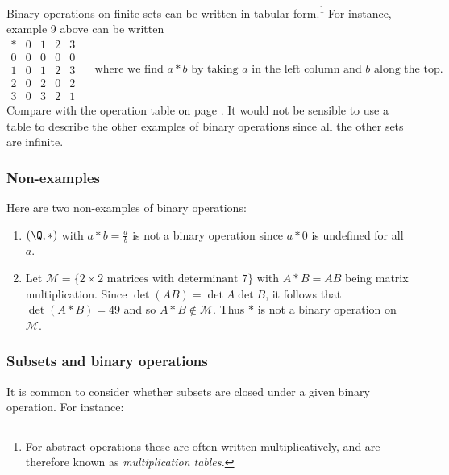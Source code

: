 Binary operations on finite sets can be written in tabular form.\footnote{For abstract operations these are often written multiplicatively, and are therefore known as \emph{multiplication tables.}} For instance, example 9 above can be written
\[\begin{array}{c||c|c|c|c}
* & 0 & 1 & 2 & 3\\
\hline\hline 0 & 0 & 0 & 0 & 0\\
\hline 1 & 0 & 1 & 2 & 3\\
\hline 2 & 0 & 2 & 0 & 2\\
\hline 3 & 0 & 3 & 2 & 1
  \end{array}\quad\text{ where we find $a*b$ by taking $a$ in the left column and $b$ along the top.}\]
Compare with the operation table on page \pageref{intro:table}. It would not be sensible to use a table to describe the other examples of binary operations since all the other sets are infinite. 

\subsubsection*{Non-examples}

Here are two non-examples of binary operations:
\begin{enumerate}
  \item $(\Q,*)$ with $a*b=\frac ab$ is not a binary operation since $a*0$ is undefined for all $a$.
  \item Let $\mathcal M=\{2\times 2\text{ matrices with determinant 7}\}$ with $A*B=AB$ being matrix multiplication. Since $\det(AB)=\det A\det B$,
  it follows that $\det(A*B)=49$ and so $A*B\not\in\mathcal M$. Thus $*$ is not a binary operation on $\mathcal M$.
\end{enumerate}

\subsubsection*{Subsets and binary operations}

It is common to consider whether subsets are closed under a given binary operation. For instance:

